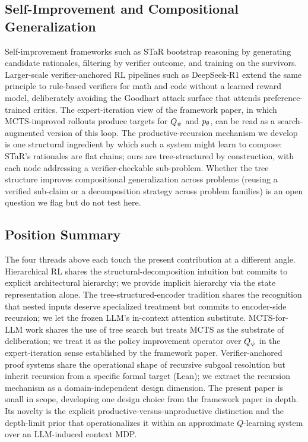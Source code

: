 \subsection{Self-Improvement and Compositional Generalization}
\label{sec:rw-self}

Self-improvement frameworks such as STaR \citep{zelikman2022star}
bootstrap reasoning by generating candidate rationales, filtering by
verifier outcome, and training on the survivors. Larger-scale
verifier-anchored RL pipelines such as DeepSeek-R1
\citep{guo2025deepseekr1} extend the same principle to rule-based
verifiers for math and code without a learned reward model,
deliberately avoiding the Goodhart attack surface that attends
preference-trained critics. The expert-iteration view of the framework
paper, in which MCTS-improved rollouts produce targets for $Q_{\psi}$ and
$p_{\theta}$, can be read as a search-augmented version of this loop. The productive-recursion mechanism we develop is
one structural ingredient by which such a system might learn to compose:
STaR's rationales are flat chains; ours are tree-structured by
construction, with each node addressing a verifier-checkable
sub-problem. Whether the tree structure improves compositional
generalization across problems (reusing a verified sub-claim or a
decomposition strategy across problem families) is an open question we
flag but do not test here.

\subsection{Position Summary}
\label{sec:rw-summary}

The four threads above each touch the present contribution at a
different angle. Hierarchical RL shares the structural-decomposition
intuition but commits to explicit architectural hierarchy; we provide
implicit hierarchy via the state representation alone. The
tree-structured-encoder tradition shares the recognition that nested
inputs deserve specialized treatment but commits to encoder-side
recursion; we let the frozen LLM's in-context attention substitute.
MCTS-for-LLM work shares the use of tree search but treats MCTS as the
substrate of deliberation; we treat it as the policy improvement
operator over $Q_{\psi}$ in the expert-iteration sense established by the
framework paper. Verifier-anchored proof systems share the operational
shape of recursive subgoal resolution but inherit recursion from a
specific formal target (Lean); we extract the recursion mechanism as a
domain-independent design dimension. The present paper is small in
scope, developing one design choice from the framework paper in depth.
Its novelty is the explicit productive-versus-unproductive distinction
and the depth-limit prior that operationalizes it within an approximate
$Q$-learning system over an LLM-induced context MDP.

